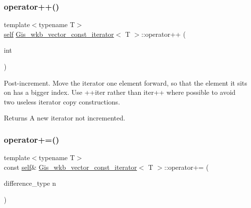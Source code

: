 \subsubsection{\texorpdfstring{operator++()}{operator++()}\hspace{0.1cm}{\footnotesize\ttfamily [2/2]}}
{\footnotesize\ttfamily template$<$typename T$>$ \\
\mbox{\hyperlink{classGis__wkb__vector__const__iterator}{self}} \mbox{\hyperlink{classGis__wkb__vector__const__iterator}{Gis\+\_\+wkb\+\_\+vector\+\_\+const\+\_\+iterator}}$<$ T $>$\+::operator++ (\begin{DoxyParamCaption}\item[{int}]{ }\end{DoxyParamCaption})\hspace{0.3cm}{\ttfamily [inline]}}



Post-\/increment. Move the iterator one element forward, so that the element it sits on has a bigger index. Use ++iter rather than iter++ where possible to avoid two useless iterator copy constructions. 

\begin{DoxyReturn}{Returns}
A new iterator not incremented. 
\end{DoxyReturn}
\mbox{\label{classGis__wkb__vector__const__iterator_a1b985aee8037b4fbe3aed2359f95dd57}} 
\subsubsection{\texorpdfstring{operator+=()}{operator+=()}}
{\footnotesize\ttfamily template$<$typename T$>$ \\
const \mbox{\hyperlink{classGis__wkb__vector__const__iterator}{self}}\& \mbox{\hyperlink{classGis__wkb__vector__const__iterator}{Gis\+\_\+wkb\+\_\+vector\+\_\+const\+\_\+iterator}}$<$ T $>$\+::operator+= (\begin{DoxyParamCaption}\item[{difference\+\_\+type}]{n }\end{DoxyParamCaption})\hspace{0.3cm}{\ttfamily [inline]}}



